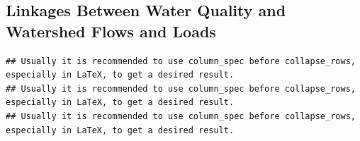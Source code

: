 \documentclass[water,article,submit,oneauthor]{Definitions/mdpi}
\begin{document}
\hypertarget{linkages-between-water-quality-and-watershed-flows-and-loads}{%
\subsection{Linkages Between Water Quality and Watershed Flows and
Loads}\label{linkages-between-water-quality-and-watershed-flows-and-loads}}

\begin{verbatim}
## Usually it is recommended to use column_spec before collapse_rows, especially in LaTeX, to get a desired result. 
## Usually it is recommended to use column_spec before collapse_rows, especially in LaTeX, to get a desired result. 
## Usually it is recommended to use column_spec before collapse_rows, especially in LaTeX, to get a desired result.
\end{verbatim}
\end{document}
